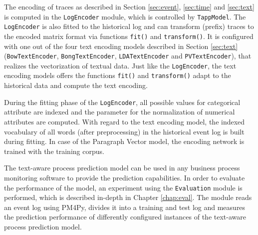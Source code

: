 The encoding of traces as described in Section \ref{sec:event}, \ref{sec:time} and \ref{sec:text} is computed in the \texttt{LogEncoder} module, which is controlled by \texttt{TappModel}.
The \texttt{LogEncoder} is also fitted to the historical log and can transform (prefix) traces to the encoded matrix format via functions \texttt{fit()} and \texttt{transform()}.
It is configured with one out of the four text encoding models described in Section \ref{sec:text} (\texttt{BowTextEncoder},  \texttt{BongTextEncoder}, \texttt{LDATextEncoder} and  \texttt{PVTextEncoder}), that realizes the vectorization of textual data.
Just like the \texttt{LogEncoder}, the text encoding models offers the functions \texttt{fit()} and \texttt{transform()} adapt to the historical data and compute the text encoding.

During the fitting phase of the  \texttt{LogEncoder}, all possible values for categorical attribute are indexed and the parameter for the normalization of numerical attributes are computed.
With regard to the text encoding model, the indexed vocabulary of all words (after preprocessing) in the historical event log is built during fitting.
In case of the Paragraph Vector model, the encoding network is trained with the training corpus.

The text-aware process prediction model can be used in any business process monitoring software to provide the prediction capabilities.
In order to evaluate the performance of the model, an experiment using the \texttt{Evaluation} module is performed, which is described in-depth in Chapter \ref{chap:eval}.
The module reads an event log using PM4Py, divides it into a training and test log and measures the prediction performance of differently configured instances of the text-aware process prediction model.